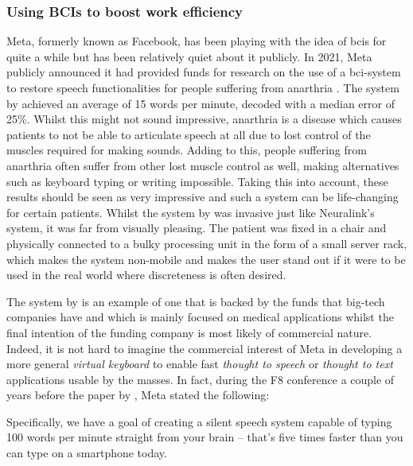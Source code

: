 
\subsubsection{Using BCIs to boost work efficiency}
\label{subsubsec:bci_gaining_popularity_big_tech_efficiency}

Meta, formerly known as Facebook, has been playing with the idea of \glspl{bci} for quite a while but has been relatively quiet about it publicly.
In 2021, Meta publicly announced it had provided funds for research on the use of a \gls{bci}-system to restore speech functionalities for people suffering from anarthria \citep{facebook_bci_keyboard, facebook_bci_blog}.
The system by \citet{facebook_bci_keyboard} achieved an average of 15 words per minute, decoded with a median error of 25\%.
Whilst this might not sound impressive, anarthria is a disease which causes patients to not be able to articulate speech at all due to lost control of the muscles required for making sounds.
Adding to this, people suffering from anarthria often suffer from other lost muscle control as well, making alternatives such as keyboard typing or writing impossible.
Taking this into account, these results should be seen as very impressive and such a system can be life-changing for certain patients.
Whilst the system by \citet{facebook_bci_keyboard} was invasive just like Neuralink's system, it was far from visually pleasing.
The patient was fixed in a chair and physically connected to a bulky processing unit in the form of a small server rack, which makes the system non-mobile and makes the user stand out if it were to be used in the real world where discreteness is often desired.

The system by \citet{facebook_bci_keyboard} is an example of one that is backed by the funds that big-tech companies have and which is mainly focused on medical applications whilst the final intention of the funding company is most likely of commercial nature.
Indeed, it is not hard to imagine the commercial interest of Meta in developing a more general \textit{virtual keyboard} to enable fast \textit{thought to speech} or \textit{thought to text} applications usable by the masses.
In fact, during the F8 conference \citep{fb_building8} a couple of years before the paper by \citet{facebook_bci_keyboard}, Meta stated the following:


\setlength{\epigraphwidth}{0.9\textwidth}
\epigraph{Specifically, we have a goal of creating a silent speech system capable of typing 100 words per minute straight from your brain – that’s five times faster than you can type on a smartphone today.}{\textit{\citet{fb_building8}}}


